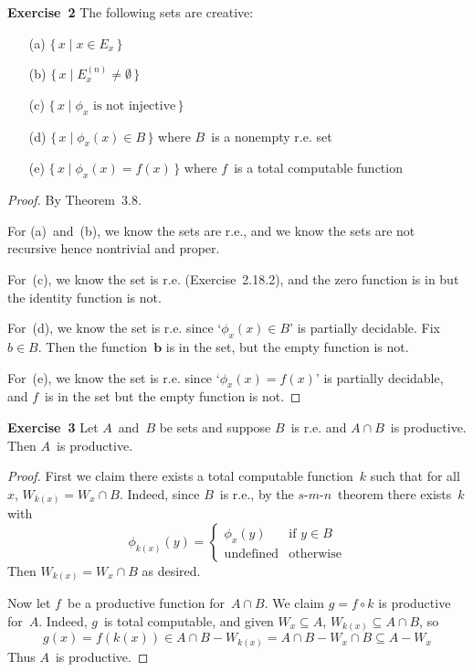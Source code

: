 \documentclass[letterpaper]{article}
\newcommand{\exercise}[2][]{\noindent\textbf{Exercise~{#2}}\ifthenelse{\isempty{#1}}{\textbf{.}}{ ({#1})\textbf{.}}}
\newcommand{\sect}{\cap}
\newcommand{\smn}{$s$-$m$-$n$}
\theoremstyle{plain}
\theoremstyle{definition}
\theoremstyle{remark}
\begin{document}
\exercise{2}
The following sets are creative:
\begin{enumerate}[itemsep=0pt]
\item[(a)] $\{\,x\mid x\in E_x\,\}$
\item[(b)] $\{\,x\mid E_x^{(n)}\ne\emptyset\,\}$
\item[(c)] $\{\,x\mid\phi_x\text{ is not injective}\,\}$
\item[(d)] $\{\,x\mid\phi_x(x)\in B\,\}$ where $B$~is a nonempty r.e. set
\item[(e)] $\{\,x\mid\phi_x(x)=f(x)\,\}$ where $f$~is a total computable function
\end{enumerate}
\begin{proof}
By Theorem~3.8.

For (a)~and~(b), we know the sets are r.e., and we know the sets are not recursive hence nontrivial and proper.

For~(c), we know the set is r.e. (Exercise~2.18.2), and the zero function is in but the identity function is not.

For~(d), we know the set is r.e. since `$\phi_x(x)\in B$' is partially decidable. Fix $b\in B$. Then the function~$\mathbf{b}$ is in the set, but the empty function is not.

For~(e), we know the set is r.e. since `$\phi_x(x)=f(x)$' is partially decidable, and $f$~is in the set but the empty function is not.
\end{proof}

\exercise{3}
Let $A$~and~$B$ be sets and suppose $B$~is r.e. and $A\sect B$~is productive. Then $A$~is productive.
\begin{proof}
First we claim there exists a total computable function~$k$ such that for all~$x$, $W_{k(x)}=W_x\sect B$. Indeed, since $B$~is r.e., by the \smn\ theorem there exists~$k$ with
$$\phi_{k(x)}(y)=\begin{cases}
\phi_x(y)&\text{if }y\in B\\
\text{undefined}&\text{otherwise}
\end{cases}$$
Then $W_{k(x)}=W_x\sect B$ as desired.

Now let $f$~be a productive function for~$A\sect B$. We claim $g=f\circ k$ is productive for~$A$. Indeed, $g$~is total computable, and given $W_x\subseteq A$, $W_{k(x)}\subseteq A\sect B$, so
$$g(x)=f(k(x))\in A\sect B-W_{k(x)}=A\sect B-W_x\sect B\subseteq A-W_x$$
Thus $A$~is productive.
\end{proof}
\end{document}
